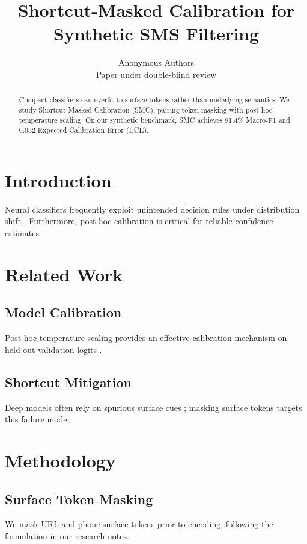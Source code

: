 \documentclass[10pt]{article}
\title{Shortcut-Masked Calibration for Synthetic SMS Filtering}
\author{Anonymous Authors\\
Paper under double-blind review}
\begin{document}
\maketitle

\begin{abstract}
Compact classifiers can overfit to surface tokens rather than underlying semantics. We study Shortcut-Masked Calibration (SMC), pairing token masking with post-hoc temperature scaling. On our synthetic benchmark, SMC achieves 91.4\% Macro-F1 and 0.032 Expected Calibration Error (ECE).
\end{abstract}

\section{Introduction}
\label{sec:intro}
Neural classifiers frequently exploit unintended decision rules under distribution shift \citep{Geirhos2020ShortcutLearning}. Furthermore, post-hoc calibration is critical for reliable confidence estimates \citep{Guo2017CalibrationModern}.

\section{Related Work}
\label{sec:related_work}
\subsection{Model Calibration}
Post-hoc temperature scaling provides an effective calibration mechanism on held-out validation logits \citep{Guo2017CalibrationModern}.

\subsection{Shortcut Mitigation}
Deep models often rely on spurious surface cues \citep{Geirhos2020ShortcutLearning}; masking surface tokens targets this failure mode.

\section{Methodology}
\label{sec:method}
\subsection{Surface Token Masking}
We mask URL and phone surface tokens prior to encoding, following the formulation in our research notes.
\end{document}
